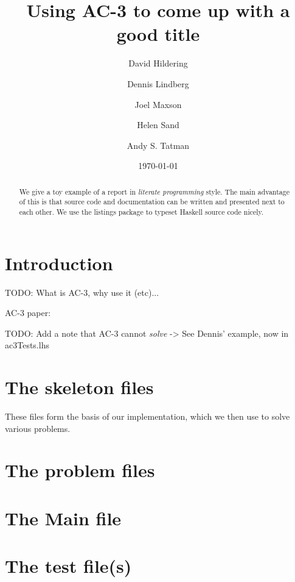 \documentclass[12pt,a4paper]{article}
\title{Using AC-3 to come up with a good title}
\author{David Hildering \and Dennis Lindberg \and Joel Maxson \and Helen Sand \and Andy S. Tatman}
\date{\today}
\begin{document}
\maketitle

\begin{abstract}
We give a toy example of a report in \emph{literate programming} style.
The main advantage of this is that source code and documentation can
be written and presented next to each other.
We use the listings package to typeset Haskell source code nicely.
\end{abstract}

\vfill

\tableofcontents

\clearpage


% 

\section{Introduction}
TODO: What is AC-3, why use it (etc)...

AC-3 paper: \cite{AC3}

TODO: Add a note that AC-3 cannot \emph{solve} -> See Dennis' example, now in ac3Tests.lhs

\section{The skeleton files}
These files form the basis of our implementation, which we then use to solve various problems.





\section{The problem files} %









\section{The Main file}



\section{The test file(s)}







\end{document}
